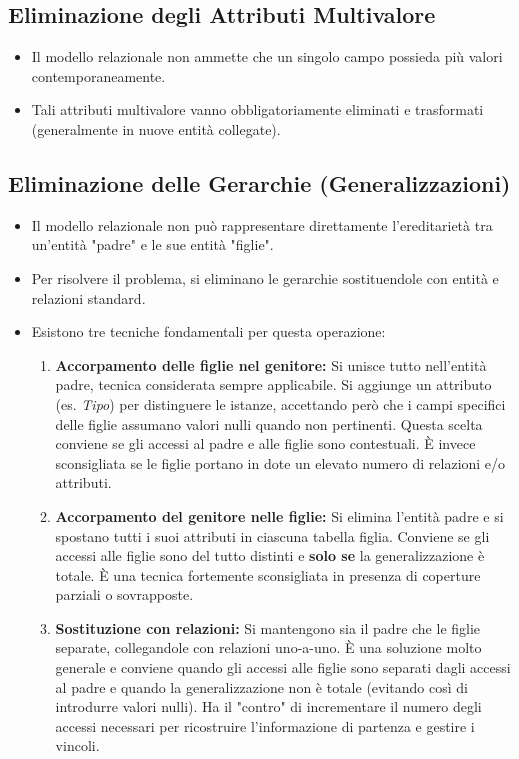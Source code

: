 \subsection{Eliminazione degli Attributi Multivalore}
\begin{itemize}
    \item Il modello relazionale non ammette che un singolo campo possieda più valori contemporaneamente.
    \item Tali attributi multivalore vanno obbligatoriamente eliminati e trasformati (generalmente in nuove entità collegate).
\end{itemize}

\subsection{Eliminazione delle Gerarchie (Generalizzazioni)}
\begin{itemize}
    \item Il modello relazionale non può rappresentare direttamente l'ereditarietà tra un'entità "padre" e le sue entità "figlie".
    \item Per risolvere il problema, si eliminano le gerarchie sostituendole con entità e relazioni standard.
    \item Esistono tre tecniche fondamentali per questa operazione:
    \begin{enumerate}
        \item \textbf{Accorpamento delle figlie nel genitore:} Si unisce tutto nell'entità padre, tecnica considerata sempre applicabile. Si aggiunge un attributo (es. \textit{Tipo}) per distinguere le istanze, accettando però che i campi specifici delle figlie assumano valori nulli quando non pertinenti. Questa scelta conviene se gli accessi al padre e alle figlie sono contestuali. È invece sconsigliata se le figlie portano in dote un elevato numero di relazioni e/o attributi.
        \item \textbf{Accorpamento del genitore nelle figlie:} Si elimina l'entità padre e si spostano tutti i suoi attributi in ciascuna tabella figlia. Conviene se gli accessi alle figlie sono del tutto distinti e \textbf{solo se} la generalizzazione è totale. È una tecnica fortemente sconsigliata in presenza di coperture parziali o sovrapposte.
        \item \textbf{Sostituzione con relazioni:} Si mantengono sia il padre che le figlie separate, collegandole con relazioni uno-a-uno. È una soluzione molto generale e conviene quando gli accessi alle figlie sono separati dagli accessi al padre e quando la generalizzazione non è totale (evitando così di introdurre valori nulli). Ha il "contro" di incrementare il numero degli accessi necessari per ricostruire l'informazione di partenza e gestire i vincoli.
    \end{enumerate}
\end{itemize}

